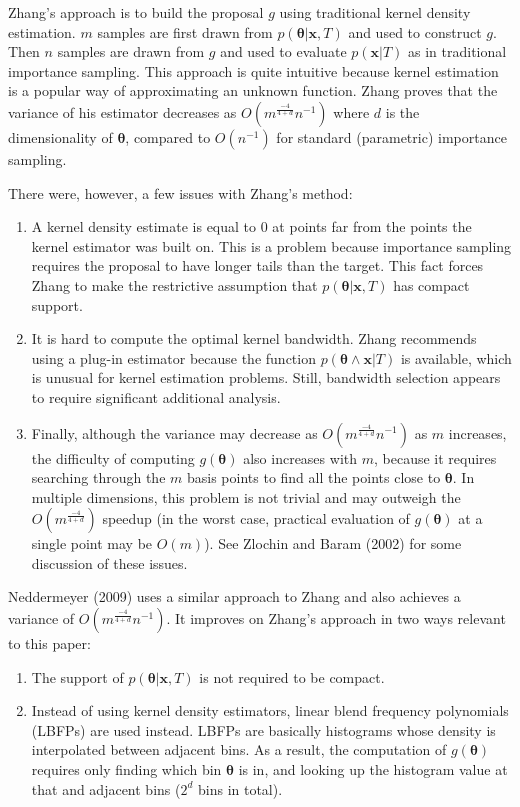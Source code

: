 \documentclass[letterpaper,12pt]{article}
\newcommand{\bx}{\boldsymbol x}
\newcommand{\btheta}{\boldsymbol \theta}
\begin{document}
Zhang's approach is to build the proposal $g$ using traditional kernel
density estimation.  $m$ samples are first drawn from $p(\btheta|\bx,
T)$ and used to construct $g$.  Then $n$ samples are drawn from $g$
and used to evaluate $p(\bx|T)$ as in traditional importance sampling.
This approach is quite intuitive because kernel estimation is a
popular way of approximating an unknown function.  Zhang proves that
the variance of his estimator decreases as $O(m^\frac{-4}{4+d}n^{-1})$
where $d$ is the dimensionality of $\btheta$, compared to $O(n^{-1})$
for standard (parametric) importance sampling.

There were, however, a few issues with Zhang's method:

\begin{enumerate}
  \item A kernel density estimate is equal to 0 at points far from the
    points the kernel estimator was built on.  This is a problem
    because importance sampling requires the proposal to have longer
    tails than the target.  This fact forces Zhang to make the
    restrictive assumption that $p(\btheta|\bx,T)$ has compact
    support.
  \item It is hard to compute the optimal kernel bandwidth.  Zhang
    recommends using a plug-in estimator because the function
    $p(\btheta \wedge \bx|T)$ is available, which is unusual for
    kernel estimation problems.  Still, bandwidth selection appears to
    require significant additional analysis.
  \item Finally, although the variance may decrease as
    $O(m^\frac{-4}{4+d}n^{-1})$ as $m$ increases, the difficulty of
    computing $g(\btheta)$ also increases with $m$, because it
    requires searching through the $m$ basis points to find all the
    points close to $\btheta$.  In multiple dimensions, this problem
    is not trivial and may outweigh the $O(m^\frac{-4}{4+d})$ speedup
    (in the worst case, practical evaluation of $g(\btheta)$ at a
    single point may be $O(m)$).  See Zlochin and Baram (2002) for
    some discussion of these issues.
\end{enumerate}

\noindent Neddermeyer (2009) uses a similar approach to Zhang and also
achieves a variance of $O(m^\frac{-4}{4+d}n^{-1})$.  It improves on
Zhang's approach in two ways relevant to this paper:

\begin{enumerate}
  \item The support of $p(\btheta|\bx,T)$ is not required to be
    compact.
  \item Instead of using kernel density estimators, linear blend
    frequency polynomials (LBFPs) are used instead.  LBFPs are
    basically histograms whose density is interpolated between
    adjacent bins.  As a result, the computation of $g(\btheta)$
    requires only finding which bin $\btheta$ is in, and looking up
    the histogram value at that and adjacent bins ($2^d$ bins in
    total).
\end{enumerate}
\end{document}
